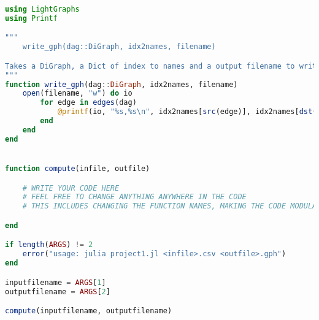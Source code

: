 \documentclass[twoside,11pt]{article}
\begin{document}
\begin{algorithm}
\begin{lstlisting}[language=Julia]
using LightGraphs
using Printf

"""
    write_gph(dag::DiGraph, idx2names, filename)

Takes a DiGraph, a Dict of index to names and a output filename to write the graph in `gph` format.
"""
function write_gph(dag::DiGraph, idx2names, filename)
    open(filename, "w") do io
        for edge in edges(dag)
            @printf(io, "%s,%s\n", idx2names[src(edge)], idx2names[dst(edge)])
        end
    end
end


function compute(infile, outfile)

    # WRITE YOUR CODE HERE
    # FEEL FREE TO CHANGE ANYTHING ANYWHERE IN THE CODE
    # THIS INCLUDES CHANGING THE FUNCTION NAMES, MAKING THE CODE MODULAR, BASICALLY ANYTHING

end

if length(ARGS) != 2
    error("usage: julia project1.jl <infile>.csv <outfile>.gph")
end

inputfilename = ARGS[1]
outputfilename = ARGS[2]

compute(inputfilename, outputfilename)
\end{lstlisting}
\end{algorithm}
\end{document}
